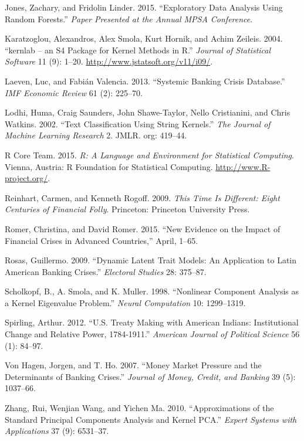 \documentclass[]{article}
\begin{document}
Jones, Zachary, and Fridolin Linder. 2015. ``Exploratory Data Analysis
Using Random Forests.'' \emph{Paper Presented at the Annual MPSA
Conference}.

Karatzoglou, Alexandros, Alex Smola, Kurt Hornik, and Achim Zeileis.
2004. ``kernlab -- an S4 Package for Kernel Methods in R.''
\emph{Journal of Statistical Software} 11 (9): 1--20.
\url{http://www.jstatsoft.org/v11/i09/}.

Laeven, Luc, and Fabi{á}n Valencia. 2013. ``Systemic Banking Crisis
Database.'' \emph{IMF Economic Review} 61 (2): 225--70.

Lodhi, Huma, Craig Saunders, John Shawe-Taylor, Nello Cristianini, and
Chris Watkins. 2002. ``Text Classification Using String Kernels.''
\emph{The Journal of Machine Learning Research} 2. JMLR. org: 419--44.

R Core Team. 2015. \emph{R: A Language and Environment for Statistical
Computing}. Vienna, Austria: R Foundation for Statistical Computing.
\url{http://www.R-project.org/}.

Reinhart, Carmen, and Kenneth Rogoff. 2009. \emph{This Time Is
Different: Eight Centuries of Financial Folly}. Princeton: Princeton
University Press.

Romer, Christina, and David Romer. 2015. ``New Evidence on the Impact of
Financial Crises in Advanced Countries,'' April, 1--65.

Rosas, Guillermo. 2009. ``Dynamic Latent Trait Models: An Application to
Latin American Banking Crises.'' \emph{Electoral Studies} 28: 375--87.

Scholkopf, B., A. Smola, and K. Muller. 1998. ``Nonlinear Component
Analysis as a Kernel Eigenvalue Problem.'' \emph{Neural Computation} 10:
1299--1319.

Spirling, Arthur. 2012. ``U.S. Treaty Making with American Indians:
Institutional Change and Relative Power, 1784-1911.'' \emph{American
Journal of Political Science} 56 (1): 84--97.

{Von Hagen}, Jorgen, and T. Ho. 2007. ``Money Market Pressure and the
Determinants of Banking Crises.'' \emph{Journal of Money, Credit, and
Banking} 39 (5): 1037--66.

Zhang, Rui, Wenjian Wang, and Yichen Ma. 2010. ``Approximations of the
Standard Principal Components Analysis and Kernel PCA.'' \emph{Expert
Systems with Applications} 37 (9): 6531--37.
\end{document}
